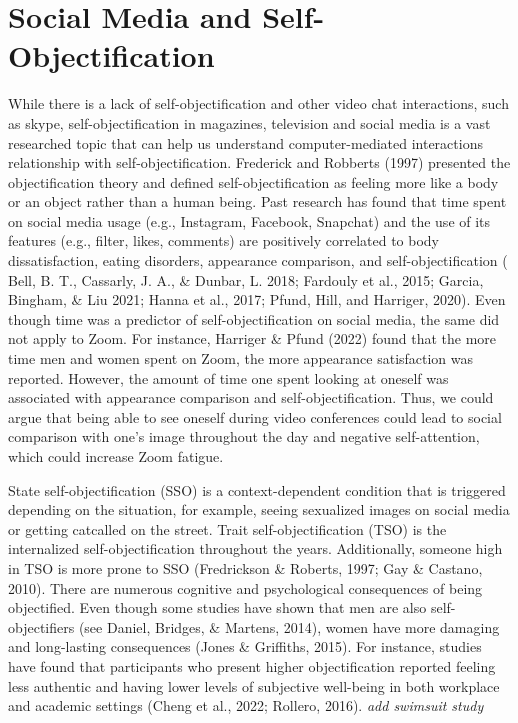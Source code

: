 \documentclass[
  english,
  man]{apa7}
\begin{document}
\hypertarget{social-media-and-self-objectification}{%
\section{Social Media and Self-Objectification}\label{social-media-and-self-objectification}}

While there is a lack of self-objectification and other video chat interactions, such as skype, self-objectification in magazines, television and social media is a vast researched topic that can help us understand computer-mediated interactions relationship with self-objectification. Frederick and Robberts (1997) presented the objectification theory and defined self-objectification as feeling more like a body or an object rather than a human being. Past research has found that time spent on social media usage (e.g., Instagram, Facebook, Snapchat) and the use of its features (e.g., filter, likes, comments) are positively correlated to body dissatisfaction, eating disorders, appearance comparison, and self-objectification ( Bell, B. T., Cassarly, J. A., \& Dunbar, L. 2018; Fardouly et al., 2015; Garcia, Bingham, \& Liu 2021; Hanna et al., 2017; Pfund, Hill, and Harriger, 2020). Even though time was a predictor of self-objectification on social media, the same did not apply to Zoom. For instance, Harriger \& Pfund (2022) found that the more time men and women spent on Zoom, the more appearance satisfaction was reported. However, the amount of time one spent looking at oneself was associated with appearance comparison and self-objectification. Thus, we could argue that being able to see oneself during video conferences could lead to social comparison with one's image throughout the day and negative self-attention, which could increase Zoom fatigue.

State self-objectification (SSO) is a context-dependent condition that is triggered depending on the situation, for example, seeing sexualized images on social media or getting catcalled on the street. Trait self-objectification (TSO) is the internalized self-objectification throughout the years. Additionally, someone high in TSO is more prone to SSO (Fredrickson \& Roberts, 1997; Gay \& Castano, 2010). There are numerous cognitive and psychological consequences of being objectified. Even though some studies have shown that men are also self-objectifiers (see Daniel, Bridges, \& Martens, 2014), women have more damaging and long-lasting consequences (Jones \& Griffiths, 2015). For instance, studies have found that participants who present higher objectification reported feeling less authentic and having lower levels of subjective well-being in both workplace and academic settings (Cheng et al., 2022; Rollero, 2016).
\emph{add swimsuit study}
\end{document}

